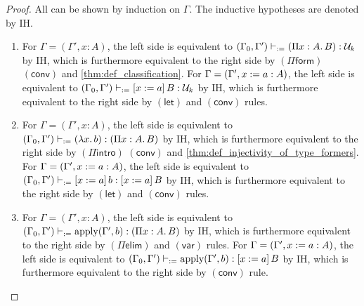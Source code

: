 \documentclass[twoside]{report}
\begin{document}
\begin{proof}
    All can be shown by induction on $\Gamma$. The inductive hypotheses are denoted by IH.
    \begin{enumerate}

        \item For $\Gamma = (\Gamma', x : A)$, the left side is equivalent to $(\Gamma_0, \Gamma') \vdash_{:=} (\Pi{x} : {A}.\,{B}) : \mathcal U_k$ by IH, which is furthermore equivalent to the right side by $(\Pi\mathsf{form})$ $(\mathsf{conv})$ and \cref{thm:def_classification}. For $\Gamma = (\Gamma', x := a : A)$, the left side is equivalent to $(\Gamma_0, \Gamma') \vdash_{:=} [{x}:={a}]\,{B} : \mathcal U_k$ by IH, which is furthermore equivalent to the right side by $(\mathsf{let})$ and $(\mathsf{conv})$ rules.

        \item For $\Gamma = (\Gamma', x : A)$, the left side is equivalent to $(\Gamma_0, \Gamma') \vdash_{:=} (\lambda{x}.\,{b}) : (\Pi{x} : {A}.\,{B})$ by IH, which is furthermore equivalent to the right side by $(\Pi\mathsf{intro})$ $(\mathsf{conv})$ and \cref{thm:def_injectivity_of_type_formers}. For $\Gamma = (\Gamma', x := a : A)$, the left side is equivalent to $(\Gamma_0, \Gamma') \vdash_{:=} [{x}:={a}]\,{b} : [{x}:={a}]\,{B}$ by IH, which is furthermore equivalent to the right side by $(\mathsf{let})$ and $(\mathsf{conv})$ rules.

        \item For $\Gamma = (\Gamma', x : A)$, the left side is equivalent to $(\Gamma_0, \Gamma') \vdash_{:=} \operatorname{apply}(\Gamma', b) : (\Pi{x} : {A}.\,{B})$ by IH, which is furthermore equivalent to the right side by $(\Pi\mathsf{elim})$ and $(\mathsf{var})$ rules. For $\Gamma = (\Gamma', x := a : A)$, the left side is equivalent to $(\Gamma_0, \Gamma') \vdash_{:=} \operatorname{apply}(\Gamma', b) : [{x}:={a}]\,{B}$ by IH, which is furthermore equivalent to the right side by $(\mathsf{conv})$ rule. \qedhere
    \end{enumerate}
\end{proof}
\end{document}
